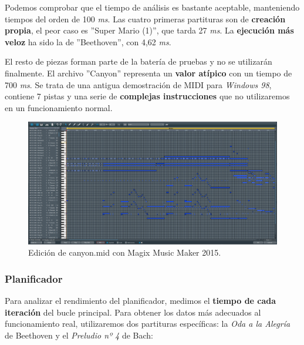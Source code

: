 \smallskip

Podemos comprobar que el tiempo de análisis es bastante aceptable, manteniendo tiempos del orden de 100 \textit{ms}. Las cuatro primeras partituras son de \textbf{creación propia}, el peor caso es ''Super Mario (1)'', que tarda 27 \textit{ms}. La \textbf{ejecución más veloz} ha sido la de ''Beethoven'', con 4,62 \textit{ms}.

El resto de piezas forman parte de la batería de pruebas y no se utilizarán finalmente. El archivo ''Canyon'' representa un \textbf{valor atípico} con un tiempo de 700 \textit{ms}. Se trata de una antigua demostración de \acrshort{MIDI} para \textit{Windows 98}, contiene 7 pistas y una serie de \textbf{complejas instrucciones} que no utilizaremos en un funcionamiento normal.

\smallskip

\begin{figure}[H]
	\noindent \begin{centering}
		\includegraphics[width=\linewidth*3/4]{capitulo6/cap_canyon}
		\par\end{centering}
	\smallskip
	\caption{\label{fig:cap_canyon} Edición de canyon.mid con Magix Music Maker 2015.}
\end{figure} 

\smallskip

\subsubsection{Planificador}

Para analizar el rendimiento del planificador, medimos el \textbf{tiempo de cada iteración} del bucle principal. Para obtener los datos más adecuados al funcionamiento real, utilizaremos dos partituras específicas: la \textit{Oda a la Alegría} de Beethoven y el \textit{Preludio nº 4} de Bach:

